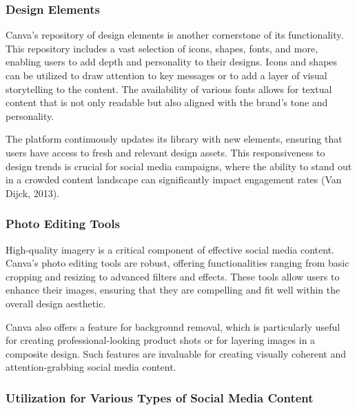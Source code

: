 \documentclass[
]{book}
\begin{document}
\hypertarget{design-elements}{%
\subsubsection*{Design Elements}\label{design-elements}}

Canva's repository of design elements is another cornerstone of its functionality. This repository includes a vast selection of icons, shapes, fonts, and more, enabling users to add depth and personality to their designs. Icons and shapes can be utilized to draw attention to key messages or to add a layer of visual storytelling to the content. The availability of various fonts allows for textual content that is not only readable but also aligned with the brand's tone and personality.

The platform continuously updates its library with new elements, ensuring that users have access to fresh and relevant design assets. This responsiveness to design trends is crucial for social media campaigns, where the ability to stand out in a crowded content landscape can significantly impact engagement rates (Van Dijck, 2013).

\hypertarget{photo-editing-tools}{%
\subsubsection*{Photo Editing Tools}\label{photo-editing-tools}}

High-quality imagery is a critical component of effective social media content. Canva's photo editing tools are robust, offering functionalities ranging from basic cropping and resizing to advanced filters and effects. These tools allow users to enhance their images, ensuring that they are compelling and fit well within the overall design aesthetic.

Canva also offers a feature for background removal, which is particularly useful for creating professional-looking product shots or for layering images in a composite design. Such features are invaluable for creating visually coherent and attention-grabbing social media content.

\hypertarget{utilization-for-various-types-of-social-media-content}{%
\subsubsection*{Utilization for Various Types of Social Media Content}\label{utilization-for-various-types-of-social-media-content}}
\end{document}
